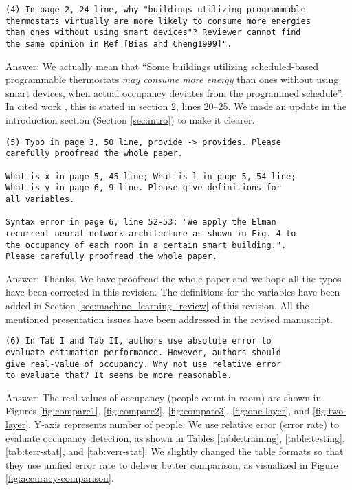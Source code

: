 \begin{verbatim}
(4) In page 2, 24 line, why "buildings utilizing programmable
thermostats virtually are more likely to consume more energies
than ones without using smart devices"? Reviewer cannot find
the same opinion in Ref [Bias and Cheng1999]".
\end{verbatim}
Answer: We actually mean that ``Some buildings utilizing
scheduled-based programmable thermostats \emph{may consume more
  energy} than ones without using smart devices, when actual occupancy
deviates from the programmed schedule''.  In cited work
\cite{bias1999elec}, this is stated in section 2, lines 20--25.  We
made an update in the introduction section (Section \ref{sec:intro})
to make it clearer.

\begin{verbatim}
(5) Typo in page 3, 50 line, provide -> provides. Please
carefully proofread the whole paper.

What is x in page 5, 45 line; What is l in page 5, 54 line;
What is y in page 6, 9 line. Please give definitions for
all variables.

Syntax error in page 6, line 52-53: "We apply the Elman
recurrent neural network architecture as shown in Fig. 4 to
the occupancy of each room in a certain smart building.".
Please carefully proofread the whole paper.
\end{verbatim}
Answer: Thanks. We have proofread the whole paper and we hope all the
typos have been corrected in this revision. The definitions
for the variables have been added in Section
\ref{sec:machine_learning_review} of this revision. All the mentioned
presentation issues have been addressed in the revised manuscript.

\begin{verbatim}
(6) In Tab I and Tab II, authors use absolute error to
evaluate estimation performance. However, authors should
give real-value of occupancy. Why not use relative error
to evaluate that? It seems be more reasonable.
\end{verbatim}
Answer: The real-values of occupancy (people count in room) are shown in Figures
\ref{fig:compare1}, \ref{fig:compare2}, \ref{fig:compare3},
\ref{fig:one-layer}, and \ref{fig:two-layer}. Y-axis represents number of
people. We use relative error (error rate) to evaluate occupancy detection, as
shown in Tables \ref{table:training}, \ref{table:testing}, \ref{tab:terr-stat},
and \ref{tab:verr-stat}. We slightly changed the table formats so that they use
unified error rate to deliver better comparison, as visualized in Figure
\ref{fig:accuracy-comparison}.

